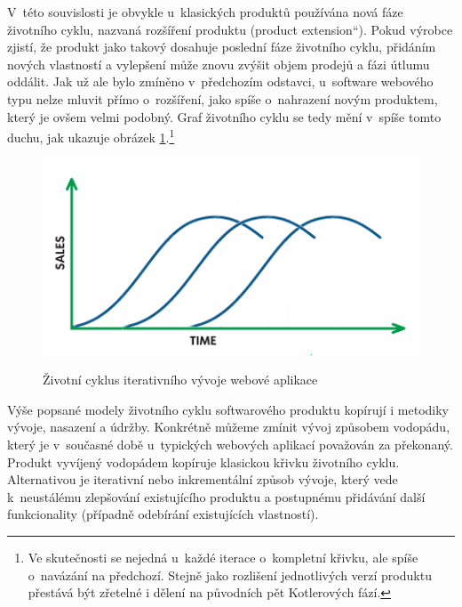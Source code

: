 \documentclass[12pt,twoside,openany]{fithesis}
\begin{document}
V~této souvislosti je obvykle u~klasických produktů používána nová fáze 
životního cyklu, nazvaná rozšíření produktu (\glqq product 
extension\textquotedblleft{}). Pokud výrobce zjistí, že produkt jako takový 
dosahuje poslední fáze životního cyklu, přidáním nových vlastností a 
vylepšení může znovu zvýšit objem prodejů a fázi útlumu oddálit. Jak 
už ale bylo zmíněno v~předchozím odstavci, u~software webového typu nelze 
mluvit přímo o~rozšíření, jako spíše o~nahrazení novým produktem, 
který je ovšem velmi podobný. Graf životního cyklu se tedy mění 
v~spíše tomto duchu, jak ukazuje obrázek 
\hyperlink{fig-product-lifecycle-sw}{{\ref{fig-product-lifecycle-sw}}}.\footnote{
    Ve skutečnosti se nejedná u~každé iterace o~kompletní křivku, ale 
spíše o~navázání na předchozí. Stejně jako rozlišení jednotlivých 
verzí produktu přestává být zřetelné i dělení na původních pět 
Kotlerových fází.}

\begin{figure}[hbt]
    \hypertarget{fig-product-lifecycle-sw}{}%
    \begin{center}

        
{{\includegraphics[]{img/product-lifecycle-sw}}\hypertarget{idp54873952}{}%
            \label{idp54873952}
        }
        {{\caption[{Životní cyklus iterativního vývoje webové 
aplikace}]{{{Životní cyklus iterativního vývoje webové 
aplikace}}}\label{fig-product-lifecycle-sw}}}
    \end{center}
\end{figure}

Výše popsané modely životního cyklu softwarového produktu kopírují i 
metodiky vývoje, nasazení a údržby. Konkrétně můžeme zmínit vývoj 
způsobem vodopádu, který je v~současné době u~typických webových 
aplikací považován za překonaný. \cite{waterfall}{} Produkt vyvíjený 
vodopádem kopíruje klasickou křivku životního cyklu. Alternativou je 
iterativní nebo inkrementální způsob vývoje, který vede k~neustálému 
zlepšování existujícího produktu a postupnému přidávání další 
funkcionality (případně odebírání existujících vlastností).
\end{document}

